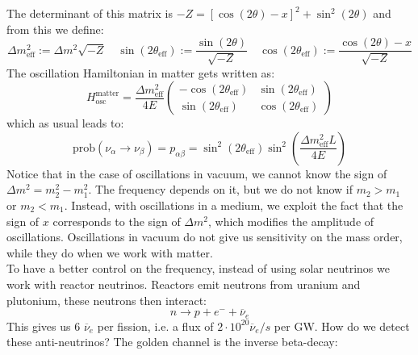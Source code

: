 \documentclass[10.75pt,a4paper,openright,bottom=2cm]{article}
\begin{document}
The determinant of this matrix is $-Z=[\cos(2\theta)-x]^2+\sin^2(2\theta)$ and from this we define:
\[
\Delta m^2_{\text{eff}}:=\Delta m^2\sqrt{-Z} \quad \sin(2\theta_{\text{eff}}):=\frac{\sin(2\theta)}{\sqrt{-Z}} \quad \cos(2\theta_{\text{eff}}):=\frac{\cos(2\theta)-x}{\sqrt{-Z}}
\]
The oscillation Hamiltonian in matter gets written as:
\[
H_{\text{osc}}^{\text{matter}}=\frac{\Delta m^2_{\text{eff}}}{4E}\left(\begin{array}{cc}
    -\cos(2\theta_{\text{eff}}) & \sin(2\theta_{\text{eff}}) \\
    \sin(2\theta_{\text{eff}}) & \cos(2\theta_{\text{eff}})
\end{array}\right)
\]
which as usual leads to:
\[
\text{prob}(\nu_\alpha\to\nu_\beta)=p_{\alpha\beta}=\sin^2(2\theta_{\text{eff}})\sin^2\left(\frac{\Delta m^2_{\text{eff}}L}{4E}\right)
\]
Notice that in the case of oscillations in vacuum, we cannot know the sign of $\Delta m^2=m_2^2-m_1^2$. The frequency depends on it, but we do not know if $m_2>m_1$ or $m_2<m_1$. Instead, with oscillations in a medium, we exploit the fact that the sign of $x$ corresponds to the sign of $\Delta m^2$, which modifies the amplitude of oscillations. Oscillations in vacuum do not give us sensitivity on the mass order, while they do when we work with matter.\\
To have a better control on the frequency, instead of using solar neutrinos we work with reactor neutrinos. Reactors emit neutrons from uranium and plutonium, these neutrons then interact:
\[
n\to p+e^-+\overline{\nu}_e
\]
This gives us 6 $\overline{\nu}_e$ per fission, i.e. a flux of $2\cdot10^{20}\overline{\nu}_e/s$ per GW. How do we detect these anti-neutrinos? The golden channel is the inverse beta-decay:
\end{document}
